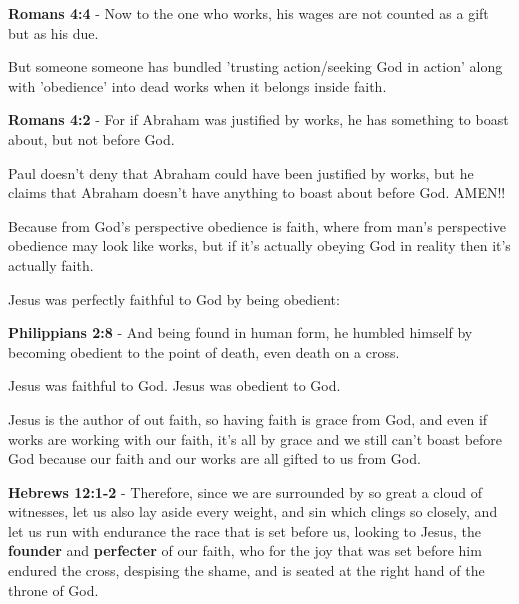 \documentclass[11pt]{article}
\begin{document}
\textbf{Romans 4:4} - Now to the one who works, his wages are not counted as a gift but as his due.

But someone someone has bundled 'trusting
action/seeking God in action' along with
'obedience' into dead works when it belongs inside
faith.

\textbf{Romans 4:2} - For if Abraham was justified by works, he has something to boast about, but not before God.

Paul doesn't deny that Abraham could have been
justified by works, but he claims that Abraham
doesn't have anything to boast about before
God. AMEN!!

Because from God's perspective obedience is faith, where from man's perspective obedience may look like works, but if it's actually obeying God in reality then it's actually faith.

Jesus was perfectly faithful to God by being obedient:

\textbf{Philippians 2:8} - And being found in human form, he humbled himself by becoming obedient to the point of death, even death on a cross.

Jesus was faithful to God. Jesus was obedient to God.

Jesus is the author of out faith, so having faith is grace from God, and even if works are working with our faith, it's all by grace and we still can't boast before God because our faith and our works are all gifted to us from God.

\textbf{Hebrews 12:1-2} - Therefore, since we are surrounded by so great a cloud of witnesses, let us also lay aside every weight, and sin which clings so closely, and let us run with endurance the race that is set before us, looking to Jesus, the \textbf{founder} and \textbf{perfecter} of our faith, who for the joy that was set before him endured the cross, despising the shame, and is seated at the right hand of the throne of God.
\end{document}
